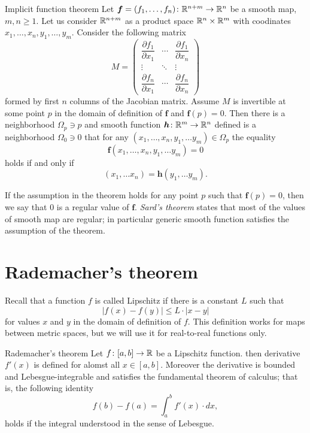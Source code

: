 \begin{thm}{Implicit function theorem}\label{thm:imlicit}
Let $\bm{f}=(f_1,\dots,f_n)\colon\mathbb{R}^{n+m}\to\mathbb{R}^n$ be a smooth map,
$m,n\ge 1$.
Let us consider $\mathbb{R}^{n+m}$ as a product space $\mathbb{R}^n\times \mathbb{R}^m$ with coodinates 
$x_1,\dots,x_n,y_1,\dots,y_m$.
Consider the following matrix 
\[
M=\begin{pmatrix}
\dfrac{\partial f_1}{\partial x_1} & \cdots & \dfrac{\partial f_1}{\partial x_n}\\
\vdots & \ddots & \vdots\\
\dfrac{\partial f_n}{\partial x_1} & \cdots & \dfrac{\partial f_n}{\partial x_n} \end{pmatrix}\]
formed by first $n$ columns of the Jacobian matrix.
Assume $M$ is invertible at some point $p$ in the domain of definition of $\bm{f}$ and $\bm{f}(p)=0$.
Then there is a neighborhood $\Omega_p\ni p$
and smooth function $\bm{h}\colon\mathbb{R}^m\to\mathbb{R}^n$ defined is a neighborhood $\Omega_0\ni 0$ that
for any $(x_1,\dots,x_n,y_1,\dots y_m)\in \Omega_p$ the equality
\[\bm{f}(x_1,\dots,x_n,y_1,\dots y_m)=0\]
holds if and only if 
\[(x_1,\dots x_n)=\bm{h}(y_1,\dots y_m).\]

\end{thm}

If the assumption in the theorem holds for any point $p$ such that $\bm{f}(p)=0$,
then we say that $0$ is a regular value of $\bm{f}$.
\emph{Sard's theorem} states that most of the values of smooth map are regular; in particular generic smooth function satisfies the assumption of the theorem.


\section*{Rademacher's theorem}

Recall that a function $f$ is called Lipschitz if there is a constant $L$ such that 
\[|f(x)-f(y)|\le L\cdot|x-y|\]
for values $x$ and $y$ in the domain of definition of $f$.
This definition works for maps between metric spaces, but we will use it for real-to-real functions only.

\begin{thm}{Rademacher's theorem} 
Let $f\colon[a,b]\to\mathbb{R}$ be a Lipschitz function.
then derivative $f'(x)$ is defined for alomst all $x\in [a,b]$.
Moreover the derivative is bounded and Lebesgue-integrable and satisfies the fundamental theorem of calculus; that is, the following identity 
\[f(b)-f(a)=\int_a^b f'(x)\cdot dx,\]
holds if the integral understood in the sense of Lebesgue.
\end{thm}



